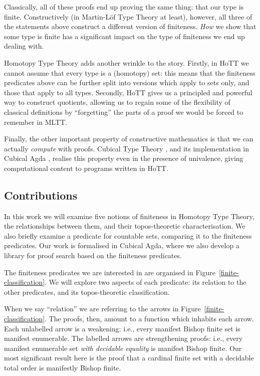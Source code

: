 Classically, all of these proofs end up proving the same thing: that our type is
finite.
Constructively (in Martin-Löf Type Theory
\cite{martin-lofIntuitionisticTypeTheory1980} at least), however, all three
of the statements above construct a different version of finiteness.
\emph{How} we show that some type is finite has a significant impact on the
type of finiteness we end up dealing with.

Homotopy Type Theory \cite{hottbook} adds another wrinkle to the story.
Firstly, in HoTT we cannot assume that every type is a (homotopy) set: this
means that the finiteness predicates above can be further split into versions
which apply to sets only, and those that apply to all types.
Secondly, HoTT gives us a principled and powerful way to construct quotients,
allowing us to regain some of the flexibility of classical definitions by
``forgetting'' the parts of a proof we would be forced to remember in MLTT.

Finally, the other important property of constructive mathematics is that we can
actually \emph{compute} with proofs.
Cubical Type Theory \cite{cohenCubicalTypeTheory2016}, and its implementation in
Cubical Agda \cite{vezzosiCubicalAgdaDependently2019}, realise this property
even in the presence of univalence, giving computational content to programs
written in HoTT.
\subsection{Contributions}
In this work we will examine five notions of finiteness in Homotopy Type Theory,
the relationships between them, and their topos-theoretic characterisation.
We also briefly examine a predicate for countable sets, comparing it to the
finiteness predicates.
Our work is formalised in Cubical Agda, where we also develop a library for
proof search based on the finiteness predicates.



The finiteness predicates we are interested in are organised in
Figure~\ref{finite-classification}.
We will explore two aspects of each predicate: its relation to the other
predicates, and its topos-theoretic classification.

When we say ``relation'' we are referring to the arrows in
Figure~\ref{finite-classification}.
The proofs, then, amount to a function which inhabits each arrow.
Each unlabelled arrow is a weakening: i.e., every manifest Bishop finite set
is manifest enumerable.
The labelled arrows are strengthening proofs: i.e., every manifest enumerable set
\emph{with decidable equality} is manifest Bishop finite.
Our most significant result here is the proof that a cardinal finite set with a
decidable total order is manifestly Bishop finite.


